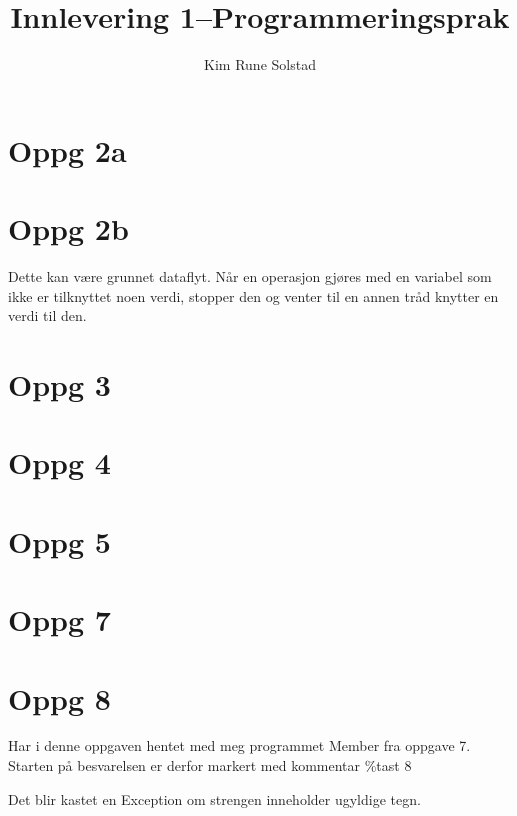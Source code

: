 \documentclass[a4paper, 11pt]{article}
\author{Kim Rune Solstad}
\title{Innlevering 1--Programmeringsprak}
\begin{document}
\maketitle
\section{Oppg 2a}

\section{Oppg 2b}



Dette kan være grunnet dataflyt. Når en operasjon gjøres med en variabel
som ikke er tilknyttet noen verdi, stopper den og venter til en annen tråd knytter en verdi til den.
\section{Oppg 3}

\section{Oppg 4}

\section{Oppg 5}


\section{Oppg 7}


\section{Oppg 8}
Har i denne oppgaven hentet med meg programmet Member fra oppgave 7. Starten på besvarelsen er derfor markert med kommentar \%tast 8

Det blir kastet en Exception om strengen inneholder ugyldige tegn.
\end{document}
